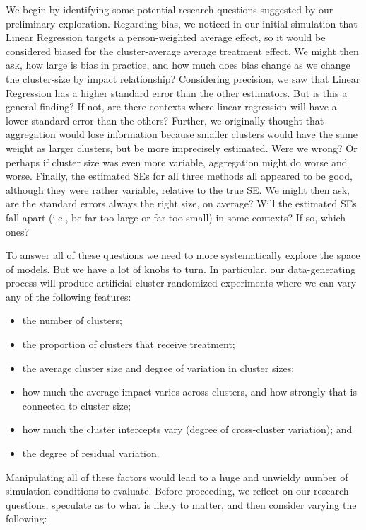\documentclass[
]{book}
\providecommand{\tightlist}{%
  \setlength{\itemsep}{0pt}\setlength{\parskip}{0pt}}
\begin{document}
We begin by identifying some potential research questions suggested by our preliminary exploration.
Regarding bias, we noticed in our initial simulation that Linear Regression targets a person-weighted average effect, so it would be considered biased for the cluster-average average treatment effect.
We might then ask, how large is bias in practice, and how much does bias change as we change the cluster-size by impact relationship?
Considering precision, we saw that Linear Regression has a higher standard error than the other estimators.
But is this a general finding? If not, are there contexts where linear regression will have a lower standard error than the others?
Further, we originally thought that aggregation would lose information because smaller clusters would have the same weight as larger clusters, but be more imprecisely estimated.
Were we wrong? Or perhaps if cluster size was even more variable, aggregation might do worse and worse.
Finally, the estimated SEs for all three methods all appeared to be good, although they were rather variable, relative to the true SE.
We might then ask, are the standard errors always the right size, on average? Will the estimated SEs fall apart (i.e., be far too large or far too small) in some contexts? If so, which ones?

To answer all of these questions we need to more systematically explore the space of models.
But we have a lot of knobs to turn.
In particular, our data-generating process will produce artificial cluster-randomized experiments where we can vary any of the following features:

\begin{itemize}
\tightlist
\item
  the number of clusters;
\item
  the proportion of clusters that receive treatment;
\item
  the average cluster size and degree of variation in cluster sizes;
\item
  how much the average impact varies across clusters, and how strongly that is connected to cluster size;
\item
  how much the cluster intercepts vary (degree of cross-cluster variation); and
\item
  the degree of residual variation.
\end{itemize}

Manipulating all of these factors would lead to a huge and unwieldy number of simulation conditions to evaluate.
Before proceeding, we reflect on our research questions, speculate as to what is likely to matter, and then consider varying the following:
\end{document}
